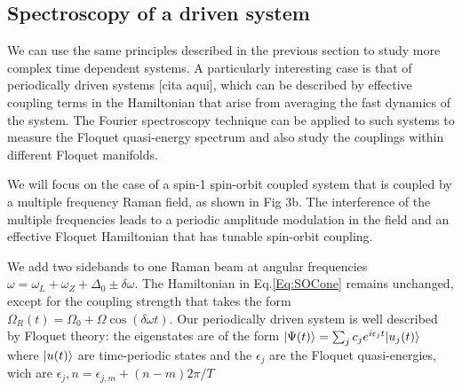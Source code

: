 
\subsection{Spectroscopy of a driven system}

We can use the same principles described in the previous section to study more complex time dependent systems. A particularly interesting case is that of periodically driven systems [cita aqui], which can be described by effective coupling terms in the Hamiltonian that arise from averaging the fast dynamics of the system. The Fourier spectroscopy technique can be applied to such systems to measure the Floquet quasi-energy spectrum and also study the couplings within different Floquet manifolds. 

We will focus on the case of a spin-1 spin-orbit coupled system that is coupled by a multiple frequency Raman field, as shown in Fig 3b. The interference of the multiple frequencies leads to a periodic amplitude modulation in the field and an effective Floquet Hamiltonian that has tunable spin-orbit coupling. 

We add two sidebands to one Raman beam at angular frequencies $\omega=\omega_L+\omega_Z+\Delta_0 \pm \delta\omega$.  The Hamiltonian in Eq.\ref{Eq:SOCone} remains unchanged, except for the coupling strength that takes the form $	\Omega_R(t)=\Omega_0 + \Omega\cos(\delta\omega t)$. Our periodically driven system is well described by Floquet theory: the eigenstates are of the form $|\Psi(t)\rangle=\sum_{j}c_je^{i\epsilon_jt}|u_j(t)\rangle$ where $|u(t)\rangle$ are time-periodic states and the $\epsilon_j$ are the Floquet quasi-energies, wich are  $\epsilon_j,n=\epsilon_{j,m} + (n-m)2\pi/T$


